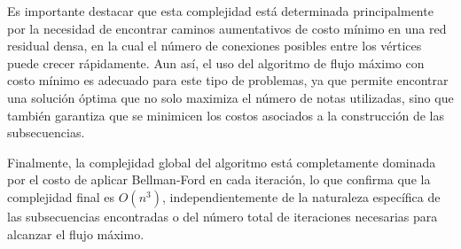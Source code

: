 \documentclass{article}
\begin{document}
Es importante destacar que esta complejidad está determinada principalmente por la necesidad de encontrar caminos aumentativos de costo mínimo en una red residual densa, en la cual el número de conexiones posibles entre los vértices puede crecer rápidamente. Aun así, el uso del algoritmo de flujo máximo con costo mínimo es adecuado para este tipo de problemas, ya que permite encontrar una solución óptima que no solo maximiza el número de notas utilizadas, sino que también garantiza que se minimicen los costos asociados a la construcción de las subsecuencias.

Finalmente, la complejidad global del algoritmo está completamente dominada por el costo de aplicar Bellman-Ford en cada iteración, lo que confirma que la complejidad final es $O(n^3)$, independientemente de la naturaleza específica de las subsecuencias encontradas o del número total de iteraciones necesarias para alcanzar el flujo máximo.
\end{document}
